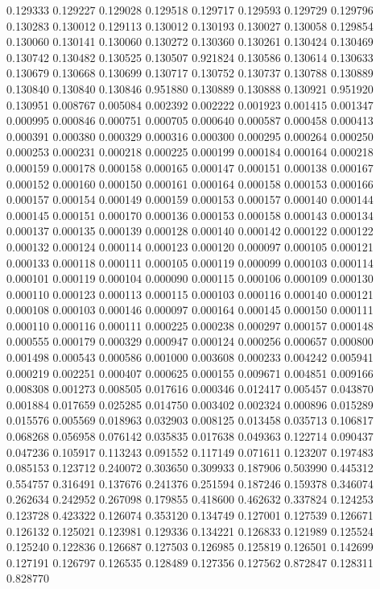 0.129333
0.129227
0.129028
0.129518
0.129717
0.129593
0.129729
0.129796
0.130283
0.130012
0.129113
0.130012
0.130193
0.130027
0.130058
0.129854
0.130060
0.130141
0.130060
0.130272
0.130360
0.130261
0.130424
0.130469
0.130742
0.130482
0.130525
0.130507
0.921824
0.130586
0.130614
0.130633
0.130679
0.130668
0.130699
0.130717
0.130752
0.130737
0.130788
0.130889
0.130840
0.130840
0.130846
0.951880
0.130889
0.130888
0.130921
0.951920
0.130951
0.008767
0.005084
0.002392
0.002222
0.001923
0.001415
0.001347
0.000995
0.000846
0.000751
0.000705
0.000640
0.000587
0.000458
0.000413
0.000391
0.000380
0.000329
0.000316
0.000300
0.000295
0.000264
0.000250
0.000253
0.000231
0.000218
0.000225
0.000199
0.000184
0.000164
0.000218
0.000159
0.000178
0.000158
0.000165
0.000147
0.000151
0.000138
0.000167
0.000152
0.000160
0.000150
0.000161
0.000164
0.000158
0.000153
0.000166
0.000157
0.000154
0.000149
0.000159
0.000153
0.000157
0.000140
0.000144
0.000145
0.000151
0.000170
0.000136
0.000153
0.000158
0.000143
0.000134
0.000137
0.000135
0.000139
0.000128
0.000140
0.000142
0.000122
0.000122
0.000132
0.000124
0.000114
0.000123
0.000120
0.000097
0.000105
0.000121
0.000133
0.000118
0.000111
0.000105
0.000119
0.000099
0.000103
0.000114
0.000101
0.000119
0.000104
0.000090
0.000115
0.000106
0.000109
0.000130
0.000110
0.000123
0.000113
0.000115
0.000103
0.000116
0.000140
0.000121
0.000108
0.000103
0.000146
0.000097
0.000164
0.000145
0.000150
0.000111
0.000110
0.000116
0.000111
0.000225
0.000238
0.000297
0.000157
0.000148
0.000555
0.000179
0.000329
0.000947
0.000124
0.000256
0.000657
0.000800
0.001498
0.000543
0.000586
0.001000
0.003608
0.000233
0.004242
0.005941
0.000219
0.002251
0.000407
0.000625
0.000155
0.009671
0.004851
0.009166
0.008308
0.001273
0.008505
0.017616
0.000346
0.012417
0.005457
0.043870
0.001884
0.017659
0.025285
0.014750
0.003402
0.002324
0.000896
0.015289
0.015576
0.005569
0.018963
0.032903
0.008125
0.013458
0.035713
0.106817
0.068268
0.056958
0.076142
0.035835
0.017638
0.049363
0.122714
0.090437
0.047236
0.105917
0.113243
0.091552
0.117149
0.071611
0.123207
0.197483
0.085153
0.123712
0.240072
0.303650
0.309933
0.187906
0.503990
0.445312
0.554757
0.316491
0.137676
0.241376
0.251594
0.187246
0.159378
0.346074
0.262634
0.242952
0.267098
0.179855
0.418600
0.462632
0.337824
0.124253
0.123728
0.423322
0.126074
0.353120
0.134749
0.127001
0.127539
0.126671
0.126132
0.125021
0.123981
0.129336
0.134221
0.126833
0.121989
0.125524
0.125240
0.122836
0.126687
0.127503
0.126985
0.125819
0.126501
0.142699
0.127191
0.126797
0.126535
0.128489
0.127356
0.127562
0.872847
0.128311
0.828770
